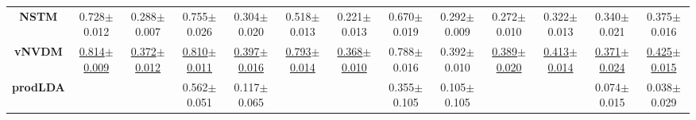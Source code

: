 \documentclass[11pt]{article}
\begin{document}
\begin{table*}[ ]
{\begin{tabular}{c|cccc|cccc|cccc|}
\textbf{NSTM}                                             & 0.728$\pm$0.012                                                    & 0.288$\pm$0.007                                                 & 0.755$\pm$0.026                                                     & 0.304$\pm$0.020                                                  & 0.518$\pm$0.013                                                    & 0.221$\pm$0.013                                                 & 0.670$\pm$0.019                                                     & 0.292$\pm$0.009                                                  & 0.272$\pm$0.010                                                    & 0.322$\pm$0.013                                                 & 0.340$\pm$0.021                                                     & 0.375$\pm$0.016                                                  \\
\textbf{vNVDM}                                             & \underline{0.814$\pm$0.009   }                                                 & \underline{0.372$\pm$0.012    }                                             & \underline{0.810$\pm$0.011}                                                     & \underline{0.397$\pm$0.016 }                                                 & \underline{0.793$\pm$0.014 }                                                   & \underline{0.368$\pm$0.010   }                                              & 0.788$\pm$0.016                                                     & 0.392$\pm$0.010                                                  & \underline{0.389$\pm$0.020  }                                                  & \underline{0.413$\pm$0.014  }                                               & \underline{0.371$\pm$0.024 }                                                    & \underline{0.425$\pm$0.015      }                                            \\
\textbf{prodLDA}                                            &                                                             &                                                          & 0.562$\pm$0.051                                                     & 0.117$\pm$0.065                                                  &                                                             &                                                          & 0.355$\pm$0.105                                                     & 0.105$\pm$0.105                                                  &                                                             &                                                          & 0.074$\pm$0.015                                                     & 0.038$\pm$0.029                                                  \\


\end{tabular}}
\end{table*}
\end{document}
